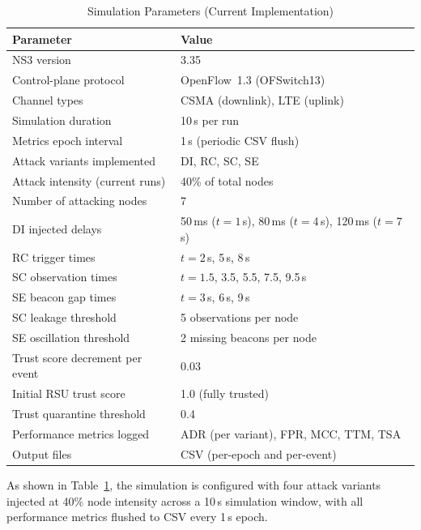 \begin{table}[htb]
\centering
\caption{Simulation Parameters (Current Implementation)}
\label{tab:sim_params}
\setlength{\tabcolsep}{5pt}
\begin{tabular}{ll}
\hline
\textbf{Parameter} & \textbf{Value} \\
\hline
NS3 version                      & 3.35 \\
Control-plane protocol           & OpenFlow~1.3 (OFSwitch13) \\
Channel types                    & CSMA (downlink), LTE (uplink) \\
Simulation duration              & 10\,s per run \\
Metrics epoch interval           & 1\,s (periodic CSV flush) \\
Attack variants implemented      & DI, RC, SC, SE \\
Attack intensity (current runs)  & 40\% of total nodes \\
Number of attacking nodes        & 7 \\
DI injected delays               & 50\,ms ($t{=}1$\,s), 80\,ms ($t{=}4$\,s),
                                   120\,ms ($t{=}7$\,s) \\
RC trigger times                 & $t{=}2$\,s, 5\,s, 8\,s \\
SC observation times             & $t{=}1.5$, 3.5, 5.5, 7.5, 9.5\,s \\
SE beacon gap times              & $t{=}3$\,s, 6\,s, 9\,s \\
SC leakage threshold             & 5 observations per node \\
SE oscillation threshold         & 2 missing beacons per node \\
Trust score decrement per event  & 0.03 \\
Initial RSU trust score          & 1.0 (fully trusted) \\
Trust quarantine threshold       & 0.4 \\
Performance metrics logged       & ADR (per variant), FPR, MCC, TTM, TSA \\
Output files                     & CSV (per-epoch and per-event) \\
\hline
\end{tabular}
\end{table}

As shown in Table~\ref{tab:sim_params}, the simulation
is configured with four attack variants injected at
40\% node intensity across a 10\,s simulation window,
with all performance metrics flushed to CSV every
1\,s epoch.

